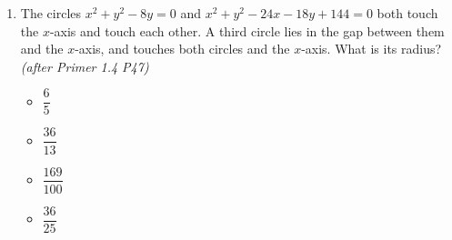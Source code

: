\documentclass[11pt,a4paper]{article}
\begin{document}
\begin{enumerate}
\item \begin{minipage}[t]{0.60\linewidth}
The circles $x^2+y^2-8y=0$ and $x^2+y^2-24x-18y+144=0$ both touch the $x$-axis and touch each other. A third circle lies in the gap between them and the $x$-axis, and touches both circles and the $x$-axis. What is its radius? \textit{\small(after Primer 1.4 P47)}
\begin{itemize}[itemsep=5pt]
\item[A)] $\dfrac65$
\item[B)] $\dfrac{36}{13}$
\item[C)] $\dfrac{169}{100}$
\item[D)] $\dfrac{36}{25}$
\end{itemize}
\end{minipage}\hfill
\begin{minipage}[t]{0.34\linewidth}
\vspace{0pt}
\centering
{}
\end{minipage}

\end{enumerate}

\end{document}
